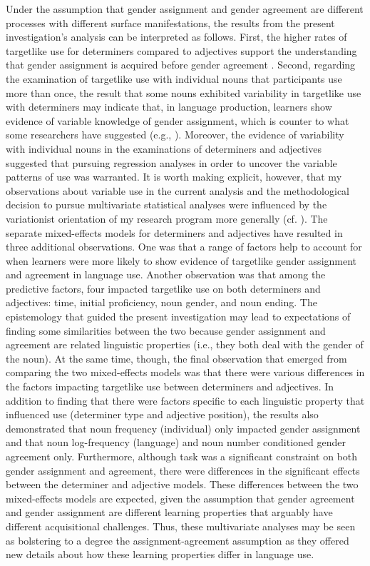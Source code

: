 \documentclass[output=paper,colorlinks,citecolor=brown,modfonts,nonflat]{../langscibook}
\begin{document}
Under the assumption that gender assignment and gender agreement are different processes with different surface manifestations, the results from the present investigation’s analysis can be interpreted as follows. First, the higher rates of targetlike use for determiners compared to adjectives support the understanding that gender assignment is acquired before gender agreement \citep{Alarcón2010}. Second, regarding the examination of targetlike use with individual nouns that participants use more than once, the result that some nouns exhibited variability in targetlike use with determiners may indicate that, in language production, learners show evidence of variable knowledge of gender assignment, which is counter to what some researchers have suggested (e.g., \citealt{Alarcón2010}). Moreover, the evidence of variability with individual nouns in the examinations of determiners and adjectives suggested that pursuing regression analyses in order to uncover the variable patterns of use was warranted. It is worth making explicit, however, that my observations about variable use in the current analysis and the methodological decision to pursue multivariate statistical analyses were influenced by the variationist orientation of my research program more generally (cf. \citealt{Young2018}). The separate mixed-effects models for determiners and adjectives have resulted in three additional observations. One was that a range of factors help to account for when learners were more likely to show evidence of targetlike gender assignment and agreement in language use. Another observation was that among the predictive factors, four impacted targetlike use on both determiners and adjectives: time, initial proficiency, noun gender, and noun ending. The epistemology that guided the present investigation may lead to expectations of finding some similarities between the two because gender assignment and agreement are related linguistic properties (i.e., they both deal with the gender of the noun). At the same time, though, the final observation that emerged from comparing the two mixed-effects models was that there were various differences in the factors impacting targetlike use between determiners and adjectives. In addition to finding that there were factors specific to each linguistic property that influenced use (determiner type and adjective position), the results also demonstrated that noun frequency (individual) only impacted gender assignment and that noun log-frequency (language) and noun number conditioned gender agreement only. Furthermore, although task was a significant constraint on both gender assignment and agreement, there were differences in the significant effects between the determiner and adjective models. These differences between the two mixed-effects models are expected, given the assumption that gender agreement and gender assignment are different learning properties that arguably have different acquisitional challenges. Thus, these multivariate analyses may be seen as bolstering to a degree the assignment-agreement assumption as they offered new details about how these learning properties differ in language use.
\end{document}
